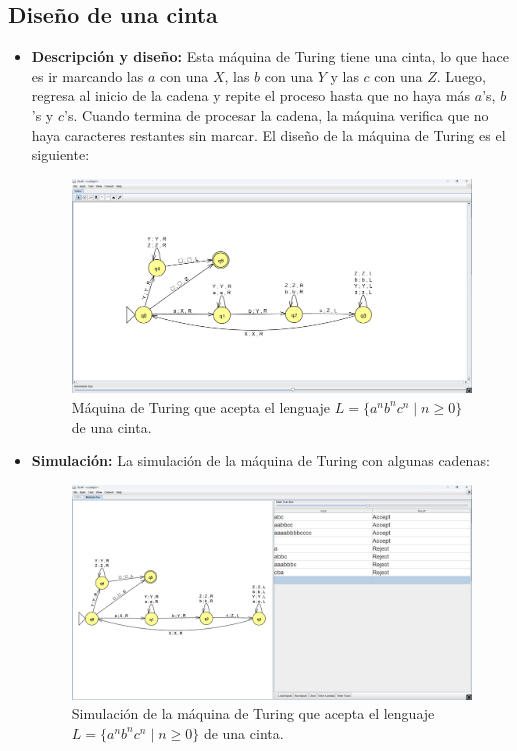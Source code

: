 \documentclass[11pt]{report}
\begin{document}
\subsection{Diseño de una cinta}
\begin{itemize}
  \item \textbf{Descripción y diseño:} Esta máquina de Turing tiene una cinta, lo que hace es ir marcando las $a$ con
        una $X$, las $b$ con una $Y$ y las $c$ con una $Z$. Luego, regresa al inicio de
        la cadena y repite el proceso hasta que no haya más $a$'s, $b$'s y $c$'s.
        Cuando termina de procesar la cadena, la máquina verifica que no haya
        caracteres restantes sin marcar. El diseño de la máquina de Turing es el siguiente:

        \begin{figure}[H]
          \centering
          \includegraphics[scale=0.33]{img/MT_01_one_ribbon.png}
          \caption{Máquina de Turing que acepta el lenguaje $L = \{a^nb^nc^n \mid n \geq 0\}$ de una cinta.}
          \label{fig:maquina de turing que acepta el lenguaje L = {a^nb^nc^n | n >= 0}}
        \end{figure}

  \newpage

  \item \textbf{Simulación:} La simulación de la máquina de Turing con algunas cadenas:
        \begin{figure}[H]
          \centering
          \includegraphics[scale=0.33]{img/MT_01_one_ribbon_simulation.png}
          \caption{Simulación de la máquina de Turing que acepta el lenguaje $L = \{a^nb^nc^n \mid n \geq 0\}$ de una cinta.}
          \label{fig:simulacion de la maquina de turing que acepta el lenguaje L = {a^nb^nc^n | n >= 0}}
        \end{figure}
\end{itemize}
\end{document}
